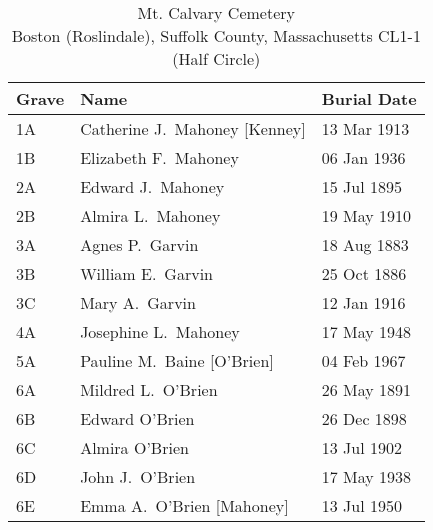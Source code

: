 \begin{table}[ht]
	\centering
	\caption{Mt. Calvary Cemetery\cite{John3OBrienBurial:3} \\
		Boston (Roslindale), Suffolk County, Massachusetts
		CL1-1 (Half Circle)}
	\begin{tabular}{|l|l|l|}
		\hline
		\textbf{Grave} & \textbf{Name} & \textbf{Burial Date} \\
		\hline
		1A & Catherine J.\ Mahoney [Kenney]\index{Kenney!Catherine Josephine}\index{Mahoney/Mahony!Catherine Josephine (Kenney)} & 13 Mar 1913 \\
		\hline
		1B & Elizabeth F.\ Mahoney\index{Mahoney/Mahony!Elizabeth F.} & 06 Jan 1936 \\
		\hline
		2A & Edward J.\ Mahoney\index{Mahoney/Mahony!Edward} & 15 Jul 1895 \\
		\hline
		2B & Almira L.\ Mahoney\index{Mahoney/Mahony!Almira L.} & 19 May 1910 \\
		\hline
		3A & Agnes P.\ Garvin\index{Garvin!Agnes P.} & 18 Aug 1883 \\
		\hline
		3B & William E.\ Garvin\index{Garvin!William E.} & 25 Oct 1886 \\
		\hline
		3C & Mary A.\ Garvin\index{Garvin!Mary A.} & 12 Jan 1916 \\
		\hline
		4A & Josephine L.\ Mahoney\index{Mahoney/Mahony!Josephine L.} & 17 May 1948 \\
		\hline
		5A & Pauline M.\ Baine [O'Brien]\index{O'Brien!Pauline M.\textsuperscript{4}}\index{Baine!Pauline M.\textsuperscript{4} (O'Brien)} & 04 Feb 1967 \\
		\hline
		6A & Mildred L.\ O'Brien\index{O'Brien!Mildred Loretta\textsuperscript{4}} & 26 May 1891 \\
		\hline
		6B & Edward O'Brien\index{O'Brien!Edward\textsuperscript{4} (1898--1898)} & 26 Dec 1898 \\
		\hline
		6C & Almira O'Brien\index{O'Brien!Almyra Louise\textsuperscript{4}} & 13 Jul 1902 \\
		\hline
		6D & John J.\ O'Brien\index{O'Brien!John Joseph\textsuperscript{3} (1861--1938)} & 17 May 1938 \\
		\hline
		6E & Emma A.\ O'Brien [Mahoney]\index{Mahoney/Mahony!Emma}\index{O'Brien!Emma (Mahony)} & 13 Jul 1950 \\
		\hline
	\end{tabular}
\end{table}

